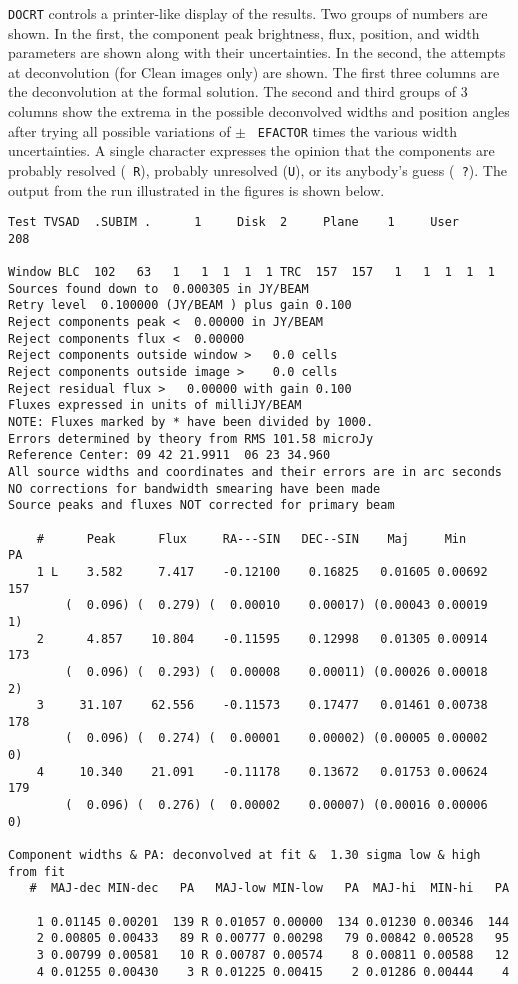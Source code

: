 \documentclass[twoside]{article}
\begin{document}
{\tt DOCRT} controls a printer-like display of the results.  Two
groups of numbers are shown.  In the first, the component peak
brightness, flux, position, and width parameters are shown along with
their uncertainties.  In the second, the attempts at deconvolution
(for Clean images only) are shown.  The first three columns are the
deconvolution at the formal solution.  The second and third groups of 3
columns show the extrema in the possible deconvolved widths and
position angles after trying all possible variations of $\pm $ {\tt
  EFACTOR} times the various width uncertainties.  A single character
expresses the opinion that the components are probably resolved ({\tt
  R}), probably unresolved ({\tt U}), or its anybody's guess ({\tt
  ?}).  The output from the run illustrated in the figures is shown
below.
\par\vspace{-10pt}\begin{verbatim}
Test TVSAD  .SUBIM .      1     Disk  2     Plane    1     User     208

Window BLC  102   63   1   1  1  1  1 TRC  157  157   1   1  1  1  1
Sources found down to  0.000305 in JY/BEAM
Retry level  0.100000 (JY/BEAM ) plus gain 0.100
Reject components peak <  0.00000 in JY/BEAM
Reject components flux <  0.00000
Reject components outside window >   0.0 cells
Reject components outside image >    0.0 cells
Reject residual flux >   0.00000 with gain 0.100
Fluxes expressed in units of milliJY/BEAM
NOTE: Fluxes marked by * have been divided by 1000.
Errors determined by theory from RMS 101.58 microJy
Reference Center: 09 42 21.9911  06 23 34.960
All source widths and coordinates and their errors are in arc seconds
NO corrections for bandwidth smearing have been made
Source peaks and fluxes NOT corrected for primary beam

    #      Peak      Flux     RA---SIN   DEC--SIN    Maj     Min     PA
    1 L    3.582     7.417    -0.12100    0.16825   0.01605 0.00692 157
        (  0.096) (  0.279) (  0.00010    0.00017) (0.00043 0.00019   1)
    2      4.857    10.804    -0.11595    0.12998   0.01305 0.00914 173
        (  0.096) (  0.293) (  0.00008    0.00011) (0.00026 0.00018   2)
    3     31.107    62.556    -0.11573    0.17477   0.01461 0.00738 178
        (  0.096) (  0.274) (  0.00001    0.00002) (0.00005 0.00002   0)
    4     10.340    21.091    -0.11178    0.13672   0.01753 0.00624 179
        (  0.096) (  0.276) (  0.00002    0.00007) (0.00016 0.00006   0)

Component widths & PA: deconvolved at fit &  1.30 sigma low & high from fit
   #  MAJ-dec MIN-dec   PA   MAJ-low MIN-low   PA  MAJ-hi  MIN-hi   PA

    1 0.01145 0.00201  139 R 0.01057 0.00000  134 0.01230 0.00346  144
    2 0.00805 0.00433   89 R 0.00777 0.00298   79 0.00842 0.00528   95
    3 0.00799 0.00581   10 R 0.00787 0.00574    8 0.00811 0.00588   12
    4 0.01255 0.00430    3 R 0.01225 0.00415    2 0.01286 0.00444    4
\end{verbatim}\par\vspace{-8pt}
\end{document}
